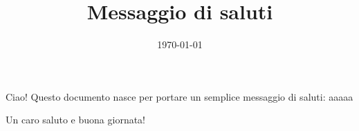 \documentclass{article}
\title{Messaggio di saluti}
\author{}
\date{\today}
\begin{document}
\maketitle

Ciao! Questo documento nasce per portare un semplice messaggio di saluti: aaaaa

\begin{center}
    \Large Un caro saluto e buona giornata!
\end{center}
\end{document}
